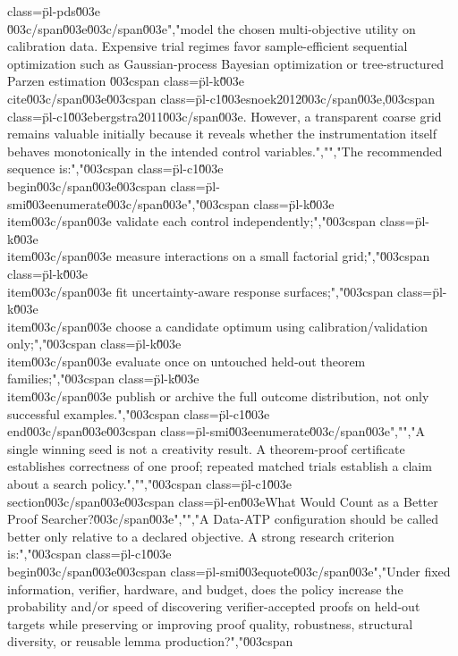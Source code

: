 {{{class=\"pl-pds\"\u003e\\[\u003c/span\u003e\u003c/span\u003e","\u003cspan class=\"pl-s\"\u003e\u003cspan class=\"pl-c1\"\u003e\\widehat\u003c/span\u003e{U}(u)\u003c/span\u003e","\u003cspan class=\"pl-s\"\u003e\u003cspan class=\"pl-pds\"\u003e\\]\u003c/span\u003e\u003c/span\u003e","model the chosen multi-objective utility on calibration data. Expensive trial regimes favor sample-efficient sequential optimization such as Gaussian-process Bayesian optimization or tree-structured Parzen estimation \u003cspan class=\"pl-k\"\u003e\\cite\u003c/span\u003e{\u003cspan class=\"pl-c1\"\u003esnoek2012\u003c/span\u003e,\u003cspan class=\"pl-c1\"\u003ebergstra2011\u003c/span\u003e}. However, a transparent coarse grid remains valuable initially because it reveals whether the instrumentation itself behaves monotonically in the intended control variables.","","The recommended sequence is:","\u003cspan class=\"pl-c1\"\u003e\\begin\u003c/span\u003e{\u003cspan class=\"pl-smi\"\u003eenumerate\u003c/span\u003e}","\u003cspan class=\"pl-k\"\u003e\\item\u003c/span\u003e validate each control independently;","\u003cspan class=\"pl-k\"\u003e\\item\u003c/span\u003e measure interactions on a small factorial grid;","\u003cspan class=\"pl-k\"\u003e\\item\u003c/span\u003e fit uncertainty-aware response surfaces;","\u003cspan class=\"pl-k\"\u003e\\item\u003c/span\u003e choose a candidate optimum using calibration/validation only;","\u003cspan class=\"pl-k\"\u003e\\item\u003c/span\u003e evaluate once on untouched held-out theorem families;","\u003cspan class=\"pl-k\"\u003e\\item\u003c/span\u003e publish or archive the full outcome distribution, not only successful examples.","\u003cspan class=\"pl-c1\"\u003e\\end\u003c/span\u003e{\u003cspan class=\"pl-smi\"\u003eenumerate\u003c/span\u003e}","","A single winning seed is not a creativity result. A theorem-proof certificate establishes correctness of one proof; repeated matched trials establish a claim about a search policy.","","\u003cspan class=\"pl-c1\"\u003e\\section\u003c/span\u003e{\u003cspan class=\"pl-en\"\u003eWhat Would Count as a Better Proof Searcher?\u003c/span\u003e}","","A Data-ATP configuration should be called better only relative to a declared objective. A strong research criterion is:","\u003cspan class=\"pl-c1\"\u003e\\begin\u003c/span\u003e{\u003cspan class=\"pl-smi\"\u003equote\u003c/span\u003e}","Under fixed information, verifier, hardware, and budget, does the policy increase the probability and/or speed of discovering verifier-accepted proofs on held-out targets while preserving or improving proof quality, robustness, structural diversity, or reusable lemma production?","\u003cspan }}}
